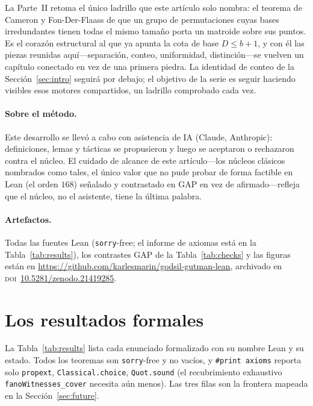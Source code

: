 \documentclass[11pt]{article}
\newcommand{\lean}[1]{\texttt{#1}}
\begin{document}
La Parte~II retoma el único ladrillo que este artículo solo nombra: el teorema de
Cameron y Fon-Der-Flaass de que un grupo de permutaciones cuyas bases irredundantes
tienen todas el mismo tamaño porta un matroide sobre sus puntos. Es el corazón
estructural al que ya apunta la cota de base $D\le b+1$, y con él las piezas reunidas
aquí---separación, conteo, uniformidad, distinción---se vuelven un capítulo conectado
en vez de una primera piedra. La identidad de conteo de la Sección~\ref{sec:intro}
seguirá por debajo; el objetivo de la serie es seguir haciendo visibles esos motores
compartidos, un ladrillo comprobado cada vez.

\paragraph{Sobre el método.} Este desarrollo se llevó a cabo con asistencia de IA
(Claude, Anthropic): definiciones, lemas y tácticas se propusieron y luego se aceptaron
o rechazaron contra el núcleo. El cuidado de alcance de este artículo---los núcleos
clásicos nombrados como tales, el único valor que no pude probar de forma factible en
Lean (el orden $168$) señalado y contrastado en GAP en vez de afirmado---refleja que el
núcleo, no el asistente, tiene la última palabra.

\paragraph{Artefactos.} Todas las fuentes Lean (\lean{sorry}-free; el informe de
axiomas está en la Tabla~\ref{tab:results}), los contrastes GAP de la
Tabla~\ref{tab:checks} y las figuras están en
\url{https://github.com/karlesmarin/godsil-gutman-lean}, archivado en
\textsc{doi}~\href{https://doi.org/10.5281/zenodo.21419285}{10.5281/zenodo.21419285}.

\appendix
\section{Los resultados formales}
\label{app:results}

La Tabla~\ref{tab:results} lista cada enunciado formalizado con su nombre Lean y su
estado. Todos los teoremas son \lean{sorry}-free y no vacíos, y \lean{\#print axioms}
reporta solo \lean{propext}, \lean{Classical.choice}, \lean{Quot.sound} (el
recubrimiento exhaustivo \lean{fanoWitnesses\_cover} necesita aún menos). Las tres
filas \stfuture{} son la frontera mapeada en la Sección~\ref{sec:future}.
\end{document}
